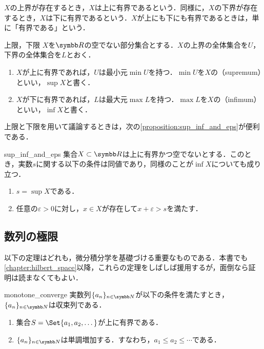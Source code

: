 \documentclass[../../main]{subfiles}
\begin{document}
\(X\)の上界が存在するとき，\(X\)は上に有界であるという．同様に，\(X\)の下界が存在するとき，\(X\)は下に有界であるという．\(X\)が上にも下にも有界であるときは，単に「有界である」という．

\begin{definition}{上限，下限}{}
  \(X\)を\(\numset{R}\)の空でない部分集合とする．\(X\)の上界の全体集合を\(U\)，下界の全体集合を\(L\)とおく．
  \begin{enumerate}
    \item \(X\)が上に有界であれば，\(U\)は最小元\(\min U\)を持つ．\(\min U\)を\(X\)の（supremum）といい，\(\sup X\)と書く．
    \item \(X\)が下に有界であれば，\(L\)は最大元\(\max L\)を持つ．\(\max L\)を\(X\)の（infimum）といい，\(\inf X\)と書く．
  \end{enumerate}
\end{definition}

上限と下限を用いて議論するときは，次の\cref{proposition:sup_inf_and_eps}が便利である．

\begin{proposition}{}{sup_inf_and_eps}
  集合\(X\subset\numset{R}\)は上に有界かつ空でないとする．このとき，実数\(s\)に関する以下の条件は同値であり，同様のことが\(\inf X\)についても成り立つ．
  \begin{enumerate}
    \item \(s=\sup X\)である．
    \item 任意の\(\varepsilon>0\)に対し，\(x\in X\)が存在して\(x+\varepsilon>s\)を満たす．
  \end{enumerate}
\end{proposition}

\subsection{数列の極限}

以下の定理はどれも，微分積分学を基礎づける重要なものである．本書でも\cref{chapter:hilbert_space}以降，これらの定理をしばしば援用するが，面倒なら証明は読まなくてもよい．

\begin{proposition}{}{monotone_converge}
  実数列\(\seq{a_n}_{n\in\numset{N}}\)が以下の条件を満たすとき，\(\seq{a_n}_{n\in\numset{N}}\)は収束列である．
  \begin{enumerate}
    \item 集合\(S=\Set{a_1,a_2,\dotsc}\)が上に有界である．
    \item \(\seq{a_n}_{n\in\numset{N}}\)は単調増加する．すなわち，\(a_1\leq a_2\leq\dotsb\)である．
  \end{enumerate}
\end{proposition}
\end{document}
